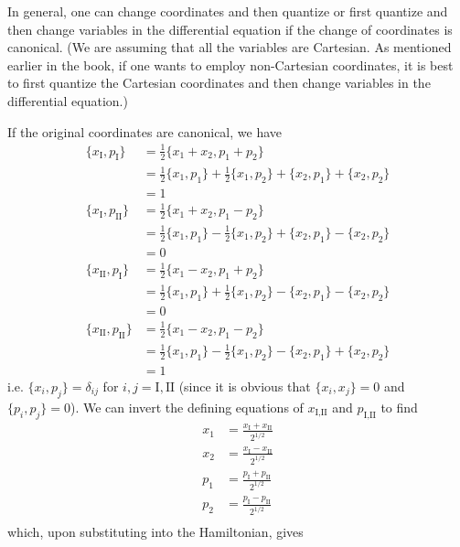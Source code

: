 \documentclass[../principles-of-quantum-mechanics.tex]{subfiles}
\begin{document}
\begin{questions}
		In general, one can change coordinates and then quantize or first quantize and then change variables in the differential equation if the change of coordinates is canonical. (We are assuming that all the variables are Cartesian. As mentioned earlier in the book, if one wants to employ non-Cartesian coordinates, it is best to first quantize the Cartesian coordinates and then change variables in the differential equation.)
		
		\begin{solution}
			If the original coordinates are canonical, we have
			\begin{align*}
				\{x_\text{I}, p_\text{I}\} &= \frac{1}{2}\{x_1 + x_2, p_1 + p_2\} \\
				&= \frac{1}{2}\{x_1, p_1\} + \frac{1}{2}\{x_1, p_2\} + \{x_2, p_1\} + \{x_2, p_2\} \\
				&= 1 \\
				\{x_\text{I}, p_\text{II}\} &= \frac{1}{2}\{x_1 + x_2, p_1 - p_2\} \\
				&= \frac{1}{2}\{x_1, p_1\} - \frac{1}{2}\{x_1, p_2\} + \{x_2, p_1\} - \{x_2, p_2\} \\
				&= 0 \\
				\{x_\text{II}, p_\text{I}\} &= \frac{1}{2}\{x_1 - x_2, p_1 + p_2\} \\
				&= \frac{1}{2}\{x_1, p_1\} + \frac{1}{2}\{x_1, p_2\} - \{x_2, p_1\} - \{x_2, p_2\} \\
				&= 0 \\
				\{x_\text{II}, p_\text{II}\} &= \frac{1}{2}\{x_1 - x_2, p_1 - p_2\} \\
				&= \frac{1}{2}\{x_1, p_1\} - \frac{1}{2}\{x_1, p_2\} - \{x_2, p_1\} + \{x_2, p_2\} \\
				&= 1
			\end{align*}
			i.e. $\{x_i, p_j\} = \delta_{ij}$ for $i, j = \text{I}, \text{II}$ (since it is obvious that $\{x_i, x_j\} = 0$ and $\{p_i, p_j\} = 0$). We can invert the defining equations of $x_{\text{I}, \text{II}}$ and $p_{\text{I}, \text{II}}$ to find
			\begin{align*}
				x_1 &= \frac{x_{\text{I}} + x_{\text{II}}}{2^{1/2}} \\
				x_2 &= \frac{x_{\text{I}} - x_{\text{II}}}{2^{1/2}} \\
				p_1 &= \frac{p_{\text{I}} + p_{\text{II}}}{2^{1/2}} \\
				p_2 &= \frac{p_{\text{I}} - p_{\text{II}}}{2^{1/2}} \\
			\end{align*}
			which, upon substituting into the Hamiltonian, gives

\end{solution}
\end{questions}
\end{document}
